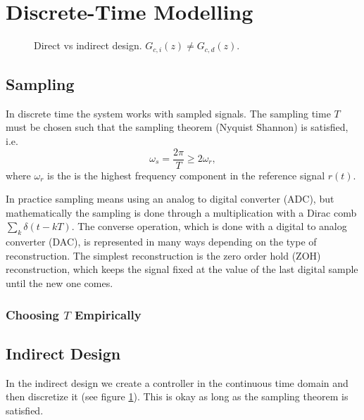 
\section{Discrete-Time Modelling}

\begin{figure}
	\centering
	
	\caption{
		Direct vs indirect design. \(G_{c,i}(z) \neq G_{c,d}(z)\).
		\label{fig:direct-vs-indirect}
	}
\end{figure}

\subsection{Sampling}

In discrete time the system works with sampled signals. The sampling time \(T\) must be chosen such that the sampling theorem (Nyquist Shannon) is satisfied, i.e.
\[
	\omega_s = \frac{2\pi}{T} \geq 2 \omega_r,
\]
where \(\omega_r\) is the is the highest frequency component in the reference signal \(r(t)\).

In practice sampling means using an analog to digital converter (ADC), but mathematically the sampling is done through a multiplication with a Dirac comb \(\sum_k \delta(t - kT)\). The converse operation, which is done with a digital to analog converter (DAC), is represented in many ways depending on the type of reconstruction. The simplest reconstruction is the zero order hold (ZOH) reconstruction, which keeps the signal fixed at the value of the last digital sample until the new one comes.

\subsubsection{Choosing \(T\) Empirically}



\subsection{Indirect Design}

In the indirect design we create a controller in the continuous time domain and then discretize it (see figure \ref{fig:direct-vs-indirect}). This is okay as long as the sampling theorem is satisfied.

